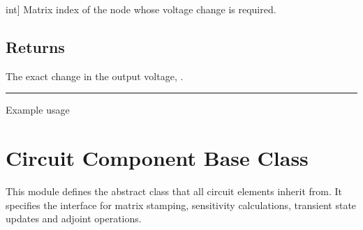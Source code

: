 \documentclass[letterpaper,10pt,english]{sphinxmanual}
\begin{document}
\begin{fulllineitems}
\begin{description}
\sphinxlineitem{output\_idx}{[}int{]}
\sphinxAtStartPar
Matrix index of the node whose voltage change is required.

\end{description}


\section{Returns}
\label{\detokenize{large_change_sensitivity:id2}}\begin{description}
\sphinxAtStartPar
The exact change in the output voltage, .

\end{description}

\end{fulllineitems}



\bigskip\hrule\bigskip


\sphinxAtStartPar
Example usage

\begin{sphinxVerbatim}[commandchars=\\\{\}]
  

    
      
\end{sphinxVerbatim}

\sphinxstepscope


\chapter{Circuit Component Base Class}
\label{\detokenize{component_base:circuit-component-base-class}}\label{\detokenize{component_base:component-base-module}}\label{\detokenize{component_base::doc}}
\sphinxAtStartPar
This module defines the abstract {\hyperref[\detokenize{component_base:Component}]{}} class that all circuit elements
inherit from.  It specifies the interface for matrix stamping, sensitivity
calculations, transient state updates and adjoint operations.
\end{document}
